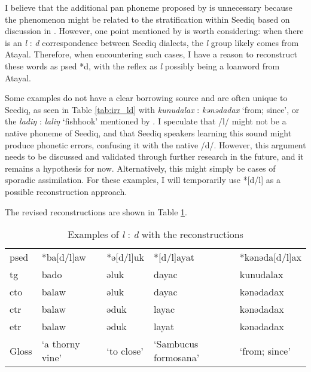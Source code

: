 I believe that the additional \acs{pan} phoneme proposed by \textcite{dyen1987d5} is unnecessary because the phenomenon might be related to the stratification within Seediq based on discussion in \textcite{song2024sedq}. However, one point mentioned by \textcite{dyen1987d5} is worth considering: when there is an \textit{l} : \textit{d} correspondence between Seediq dialects, the \textit{l} group likely comes from Atayal. Therefore, when encountering such cases, I have a reason to reconstruct these words as \acl{psed} *d, with the reflex as \textit{l} possibly being a loanword from Atayal.

Some examples do not have a clear borrowing source and are often unique to Seediq, as seen in Table \ref{tab:irr_ld} with \textit{kunudalax} : \textit{kənədadax} `from; since', or the \textit{ladiŋ} : \textit{laliŋ} `fishhook' mentioned by \textcite[175]{dyen1987d5}. I speculate that /l/ might not be a native phoneme of Seediq, and that Seediq speakers learning this sound might produce phonetic errors, confusing it with the native /d/. However, this argument needs to be discussed and validated through further research in the future, and it remains a hypothesis for now. Alternatively, this might simply be cases of sporadic assimilation. For these examples, I will temporarily use *[d/l] as a possible reconstruction approach.

The revised reconstructions are shown in Table \ref{tab:irr_ld2}. 

\begin{table}[!htbp]
\centering
\caption{Examples of \textit{l} : \textit{d} with the reconstructions}
\label{tab:irr_ld2}
\begin{tabular}{lllll}
\hline
\acs{psed} & *ba[d/l]aw      & *ə[d/l]uk  & *[d/l]ayat           & *kənəda[d/l]ax    \\ \hdashline
\acs{tg}   & bado            & əluk       & dayac                & kunudalax     \\
\acs{cto}  & balaw           & əluk       & dayac                & kənədadax     \\
\acs{ctr}  & balaw           & əduk       & layac                & kənədadax     \\
\acs{etr}  & balaw           & əduk       & layat                & kənədadax     \\ \hline
Gloss      & `a thorny vine' & `to close' & `Sambucus formosana' & `from; since' \\ \hline
\end{tabular}
\end{table}

